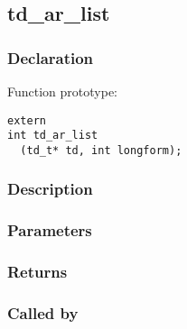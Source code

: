 
\newpage
\subsection{td\_ar\_list}
\subsubsection{Declaration} Function prototype:

\begin{verbatim}
extern
int td_ar_list
  (td_t* td, int longform);
\end{verbatim}

\subsubsection{Description}



\subsubsection{Parameters}
\subsubsection{Returns}
\subsubsection{Called by}
